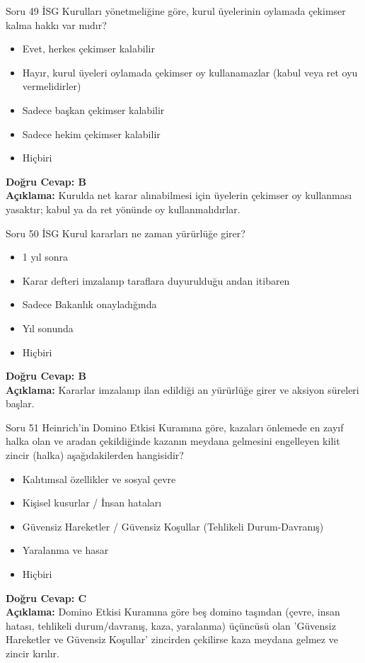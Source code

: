 \documentclass[12pt,a4paper]{article}
\begin{document}
\begin{testcard}{Soru 49}
    İSG Kurulları yönetmeliğine göre, kurul üyelerinin oylamada çekimser kalma hakkı var mıdır?
    \begin{itemize}
        \item[A)] Evet, herkes çekimser kalabilir
        \item[B)] Hayır, kurul üyeleri oylamada çekimser oy kullanamazlar (kabul veya ret oyu vermelidirler)
        \item[C)] Sadece başkan çekimser kalabilir
        \item[D)] Sadece hekim çekimser kalabilir
        \item[E)] Hiçbiri
    \end{itemize}
    \tcblower
    \textbf{Doğru Cevap: B} \\
    \textbf{Açıklama:} Kurulda net karar alınabilmesi için üyelerin çekimser oy kullanması yasaktır; kabul ya da ret yönünde oy kullanmalıdırlar.
\end{testcard}

\begin{testcard}{Soru 50}
    İSG Kurul kararları ne zaman yürürlüğe girer?
    \begin{itemize}
        \item[A)] 1 yıl sonra
        \item[B)] Karar defteri imzalanıp taraflara duyurulduğu andan itibaren
        \item[C)] Sadece Bakanlık onayladığında
        \item[D)] Yıl sonunda
        \item[E)] Hiçbiri
    \end{itemize}
    \tcblower
    \textbf{Doğru Cevap: B} \\
    \textbf{Açıklama:} Kararlar imzalanıp ilan edildiği an yürürlüğe girer ve aksiyon süreleri başlar.
\end{testcard}

\begin{testcard}{Soru 51}
    Heinrich'in Domino Etkisi Kuramına göre, kazaları önlemede en zayıf halka olan ve aradan çekildiğinde kazanın meydana gelmesini engelleyen kilit zincir (halka) aşağıdakilerden hangisidir?
    \begin{itemize}
        \item[A)] Kalıtımsal özellikler ve sosyal çevre
        \item[B)] Kişisel kusurlar / İnsan hataları
        \item[C)] Güvensiz Hareketler / Güvensiz Koşullar (Tehlikeli Durum-Davranış)
        \item[D)] Yaralanma ve hasar
        \item[E)] Hiçbiri
    \end{itemize}
    \tcblower
    \textbf{Doğru Cevap: C} \\
    \textbf{Açıklama:} Domino Etkisi Kuramına göre beş domino taşından (çevre, insan hatası, tehlikeli durum/davranış, kaza, yaralanma) üçüncüsü olan 'Güvensiz Hareketler ve Güvensiz Koşullar' zincirden çekilirse kaza meydana gelmez ve zincir kırılır.
\end{testcard}
\end{document}
